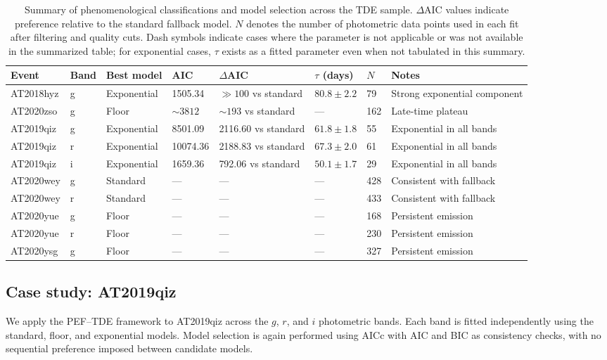 \documentclass[11pt]{article}
\begin{document}
\begin{table}[H]
\centering
\scriptsize
\begin{tabular}{llllllll}
\toprule
Event & Band & Best model & AIC & $\Delta$AIC & $\tau$ (days) & $N$ & Notes \\
\midrule
AT2018hyz & g & Exponential & 1505.34 & $\gg100$ vs standard & $80.8\pm2.2$ & 79 & Strong exponential component \\
AT2020zso & g & Floor & $\sim3812$ & $\sim193$ vs standard & --- & 162 & Late-time plateau \\
AT2019qiz & g & Exponential & 8501.09 & 2116.60 vs standard & $61.8\pm1.8$ & 55 & Exponential in all bands \\
AT2019qiz & r & Exponential & 10074.36 & 2188.83 vs standard & $67.3\pm2.0$ & 61 & Exponential in all bands \\
AT2019qiz & i & Exponential & 1659.36 & 792.06 vs standard & $50.1\pm1.7$ & 29 & Exponential in all bands \\
AT2020wey & g & Standard & --- & --- & --- & 428 & Consistent with fallback \\
AT2020wey & r & Standard & --- & --- & --- & 433 & Consistent with fallback \\
AT2020yue & g & Floor & --- & --- & --- & 168 & Persistent emission \\
AT2020yue & r & Floor & --- & --- & --- & 230 & Persistent emission \\
AT2020ysg & g & Floor & --- & --- & --- & 327 & Persistent emission \\
\bottomrule
\end{tabular}
\caption{Summary of phenomenological classifications and model selection across the TDE sample. $\Delta$AIC values indicate preference relative to the standard fallback model. $N$ denotes the number of photometric data points used in each fit after filtering and quality cuts. Dash symbols indicate cases where the parameter is not applicable or was not available in the summarized table; for exponential cases, $\tau$ exists as a fitted parameter even when not tabulated in this summary.}
\label{tab:summary}
\end{table}


\subsection{Case study: AT2019qiz}
We apply the PEF--TDE framework to AT2019qiz across the $g$, $r$, and $i$ photometric bands. Each band is fitted independently using the standard, floor, and exponential models. Model selection is again performed using AICc with AIC and BIC as consistency checks, with no sequential preference imposed between candidate models.
\end{document}

